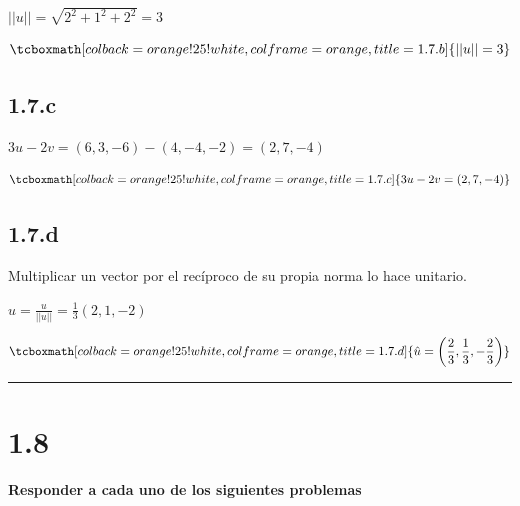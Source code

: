 \documentclass{article}
\begin{document}
$||u|| = \sqrt{2^2 + 1^2 + 2^2} = 3$

\begin{equation}
\tcboxmath[colback=orange!25!white,colframe=orange,title=1.7.b]
{ ||u|| = 3 }
\end{equation}

\subsection*{1.7.c}
\label{subsec:1.7.c}

$3u - 2v = (6, 3, -6) - (4, -4, -2) = (2, 7, -4)$

\begin{equation}
\tcboxmath[colback=orange!25!white,colframe=orange,title=1.7.c]
{ 3u - 2v = (2, 7, -4) }
\end{equation}

\subsection*{1.7.d}
\label{subsec:1.7.d}

Multiplicar un vector por el recíproco de su propia norma lo hace unitario.

$\hat{u} = \frac{u}{||u||} = \frac{1}{3} (2, 1, -2)$
 
\begin{equation}
\tcboxmath[colback=orange!25!white,colframe=orange,title=1.7.d]
{ \hat{u} = \left( \frac{2}{3}, \frac{1}{3}, -\frac{2}{3} \right) }
\end{equation}

\hrule
\vspace{10 pt}

\section*{1.8}
\label{sec:1.8}

\textbf{Responder a cada uno de los siguientes problemas}
\end{document}

